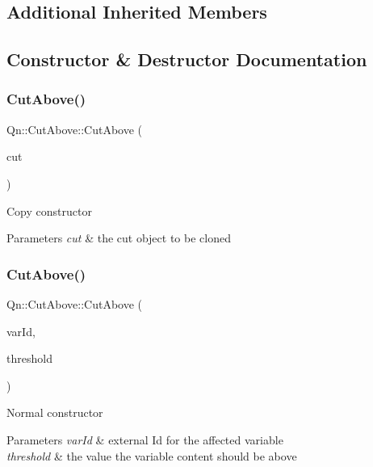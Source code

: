 \subsection*{Additional Inherited Members}


\subsection{Constructor \& Destructor Documentation}
\mbox{\label{classQn_1_1CutAbove_a8921d1babf244944f2c5ca072fd68489}} 
\subsubsection{\texorpdfstring{Cut\+Above()}{CutAbove()}\hspace{0.1cm}{\footnotesize\ttfamily [1/2]}}
{\footnotesize\ttfamily Qn\+::\+Cut\+Above\+::\+Cut\+Above (\begin{DoxyParamCaption}\item[{const \mbox{\hyperlink{classQn_1_1CutAbove}{Cut\+Above}} \&}]{cut }\end{DoxyParamCaption})}

Copy constructor 
\begin{DoxyParams}{Parameters}
{\em cut} & the cut object to be cloned \\
\hline
\end{DoxyParams}
\mbox{\label{classQn_1_1CutAbove_aa5586d4101ac6cd2720e2b1bdb608132}} 
\subsubsection{\texorpdfstring{Cut\+Above()}{CutAbove()}\hspace{0.1cm}{\footnotesize\ttfamily [2/2]}}
{\footnotesize\ttfamily Qn\+::\+Cut\+Above\+::\+Cut\+Above (\begin{DoxyParamCaption}\item[{Int\+\_\+t}]{var\+Id,  }\item[{Float\+\_\+t}]{threshold }\end{DoxyParamCaption})}

Normal constructor 
\begin{DoxyParams}{Parameters}
{\em var\+Id} & external Id for the affected variable \\
\hline
{\em threshold} & the value the variable content should be above \\
\hline
\end{DoxyParams}



